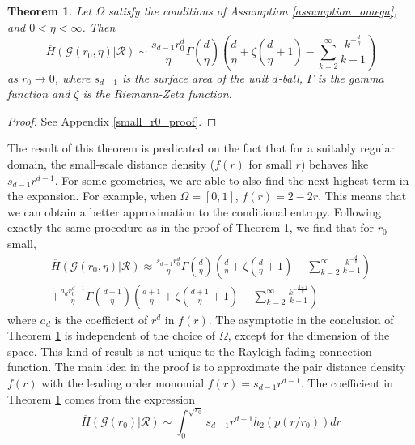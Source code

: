 \documentclass{article}
\newtheorem{theorem}{Theorem}
\newcommand{\graph}{\mathcal{G}}
\newcommand{\ttz}[0]{\rightarrow 0}
\begin{document}
    \begin{theorem}
        \label{small_r0_asymptotic}
        Let $\Omega$ satisfy the conditions of Assumption \ref{assumption_omega}, and $0 < \eta < \infty$. Then
        \begin{equation}
            \overline{H}(\graph(r_0,\eta)|\mathcal{R}) \sim \frac{s_{d-1}r_0^d}{\eta}\Gamma\left(\frac{d}{\eta}\right)\left(\frac{d}{\eta}+\zeta\left(\frac{d}{\eta}+1\right)-\sum_{k=2}^{\infty}\frac{k^{-\frac{d}{\eta}}}{k-1}\right)
        \end{equation}
        as $r_0 \ttz$, where $s_{d-1}$ is the surface area of the unit $d$-ball, $\Gamma$ is the gamma function and $\zeta$ is the Riemann-Zeta function.
    \end{theorem}
    \begin{proof}
        See Appendix \ref{small_r0_proof}.
    \end{proof}
    The result of this theorem is predicated on the fact that for a suitably regular domain, the small-scale distance density ($f(r)$ for small $r$) behaves like $s_{d-1}r^{d-1}$. For some geometries, we are able to also find the next highest term in the expansion. For example, when $\Omega = [0,1]$, $f(r) = 2-2r$. This means that we can obtain a better approximation to the conditional entropy. Following exactly the same procedure as in the proof of Theorem \ref{small_r0_asymptotic}, we find that for $r_0$ small, 
    \begin{align}
            \label{higher_order}
            \overline{H}(\graph(r_0,\eta)|\mathcal{R}) \approx \frac{s_{d-1}r_0^d}{\eta}\Gamma\left(\frac{d}{\eta}\right)\left(\frac{d}{\eta} + \zeta\left(\frac{d}{\eta}+1\right)-\sum_{k=2}^{\infty}\frac{k^{-\frac{d}{\eta}}}{k-1}\right) \nonumber \\
            + \frac{a_dr_0^{d+1}}{\eta}\Gamma\left(\frac{d+1}{\eta}\right)\left(\frac{d+1}{\eta}+\zeta\left(\frac{d+1}{\eta}+1\right)-\sum_{k=2}^{\infty}\frac{k^{-\frac{d+1}{\eta}}}{k-1}\right)
    \end{align}
    where $a_d$ is the coefficient of $r^d$ in $f(r)$. The asymptotic in the conclusion of Theorem \ref{small_r0_asymptotic} is independent of the choice of $\Omega$, except for the dimension of the space. This kind of result is not unique to the Rayleigh fading connection function. The main idea in the proof is to approximate the pair distance density $f(r)$ with the leading order monomial $f(r) = s_{d-1}r^{d-1}$. The coefficient in Theorem \ref{small_r0_asymptotic} comes from the expression
    \begin{equation}
        \overline{H}(\graph(r_0)|\mathcal{R}) \sim \int_0^{\sqrt{r_0}} s_{d-1}r^{d-1} h_2(p(r/r_0)) dr
    \end{equation}
\end{document}
